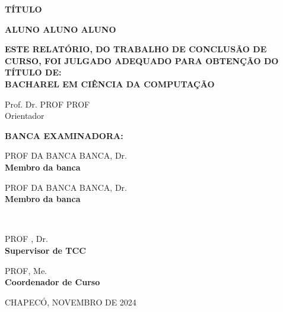 
    \OnehalfSpacing
    \begin{center}
        \ABNTEXchapterfont%

        \MakeTextUppercase{\textbf{TÍTULO}}

        \vspace{2\baselineskip}

        \MakeTextUppercase{\textbf{ALUNO ALUNO ALUNO}}

        \vspace{2\baselineskip}
        
        \MakeTextUppercase{\textbf{ESTE RELATÓRIO, DO TRABALHO DE CONCLUSÃO DE CURSO, FOI JULGADO ADEQUADO PARA OBTENÇÃO DO TÍTULO DE:}}\\
        \vspace{\baselineskip}
        \MakeTextUppercase{\textbf{BACHAREL EM CIÊNCIA DA COMPUTAÇÃO} }
        
        \vspace{3\baselineskip}

        \textmd{Prof. Dr. PROF PROF}\\
        Orientador\\
    \end{center}

    \vspace{2\baselineskip}
    \noindent
    \textbf{BANCA EXAMINADORA:}\\
   
    \vspace{3\baselineskip}

    \noindent
    \begin{minipage}{0.5\textwidth}
        \mdseries
        \SingleSpacing
        \centering

        \textmd{PROF DA BANCA BANCA}, \textmd{Dr.}\\
        \textbf{Membro da banca}
    \end{minipage}
    \hfill
    \begin{minipage}{0.5\textwidth}
        \mdseries
        \SingleSpacing
        \centering

        \textmd{PROF DA BANCA BANCA}, \textmd{Dr.}\\
        \textbf{Membro da banca}
    \end{minipage}\\

    \vspace{3\baselineskip}
    \noindent
    \begin{minipage}{0.5\textwidth}
        \mdseries
        \SingleSpacing
        \centering

        \textmd{PROF }, \textmd{Dr.}\\
        \textbf{Supervisor de TCC}
    \end{minipage}
    \hfill
    \begin{minipage}{0.5\textwidth}
        
            \mdseries
            \SingleSpacing
            \centering

            \textmd{PROF}, \textmd{Me.}\\
            \textbf{Coordenador de Curso}
    \end{minipage}

    \vfill
    \begin{center}
        \textmd{CHAPECÓ, NOVEMBRO DE 2024}
    \end{center}
    \clearpage
    
